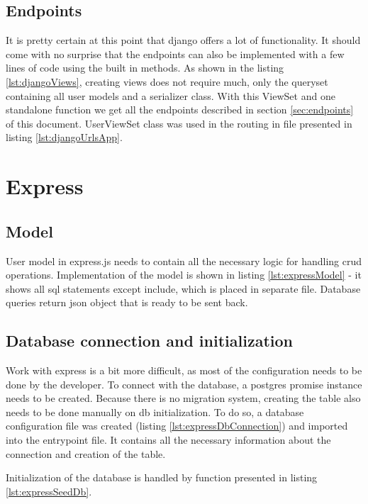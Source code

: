 \subsection{Endpoints}
It is pretty certain at this point that django offers a lot of functionality. It should come with no surprise that the endpoints can also be implemented with a few lines of code using the built in methods. As shown in the listing \ref{lst:djangoViews}, creating views does not require much, only the queryset containing all user models and a serializer class.  With this ViewSet and one standalone function we get all the endpoints described in section \ref{sec:endpoints} of this document. UserViewSet class was used in the routing in file presented in listing \ref{lst:djangoUrlsApp}.




%
%
\section{Express}
\subsection{Model}
User model in express.js needs to contain all the necessary logic for handling \acrshort{crud} operations. Implementation of the model is shown in listing \ref{lst:expressModel} - it shows all \acrshort{sql} statements except include, which is placed in separate file. Database queries return \acrshort{json} object that is ready to be sent back.


\subsection{Database connection and initialization}
Work with express is a bit more difficult, as most of the configuration needs to be done by the developer. To connect with the database, a postgres promise instance needs to be created. Because there is no migration system, creating the table also needs to be done manually on \acrshort{db} initialization. To do so, a database configuration file was created (listing \ref{lst:expressDbConnection}) and imported into the entrypoint file. It contains all the necessary information about the connection and creation of the table.

Initialization of the database is handled by function presented in listing \ref{lst:expressSeedDb}.



